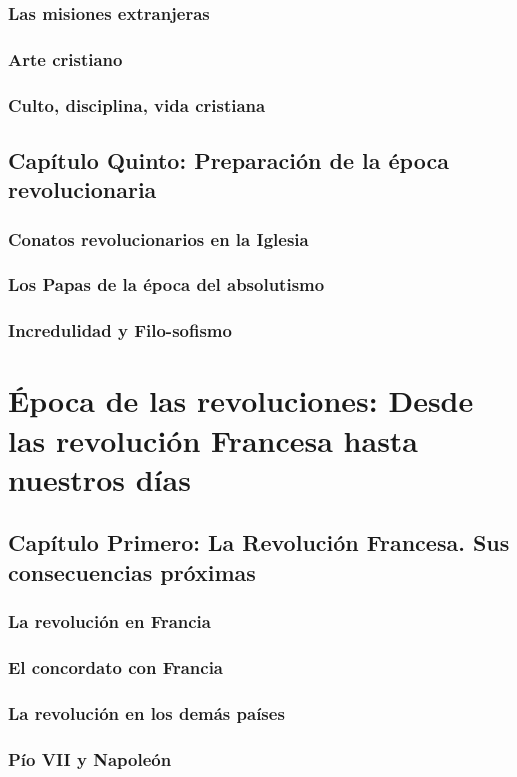 \raggedbottom{} \documentclass[12pt, a4paper]{book}
\begin{document}
\section{Las misiones extranjeras}
\section{Arte cristiano}
\section{Culto, disciplina, vida cristiana}
\chapter{Capítulo Quinto: Preparación de la época revolucionaria}
\section{Conatos revolucionarios en la Iglesia}
\section{Los Papas de la época del absolutismo}
\section{Incredulidad y Filo-sofismo}
\part{Época de las revoluciones: Desde las revolución Francesa hasta nuestros días}
\chapter{Capítulo Primero: La Revolución Francesa. Sus consecuencias próximas}
\section{La revolución en Francia}
\section{El concordato con Francia}
\section{La revolución en los demás países}
\section{Pío VII y Napoleón}
\end{document}
